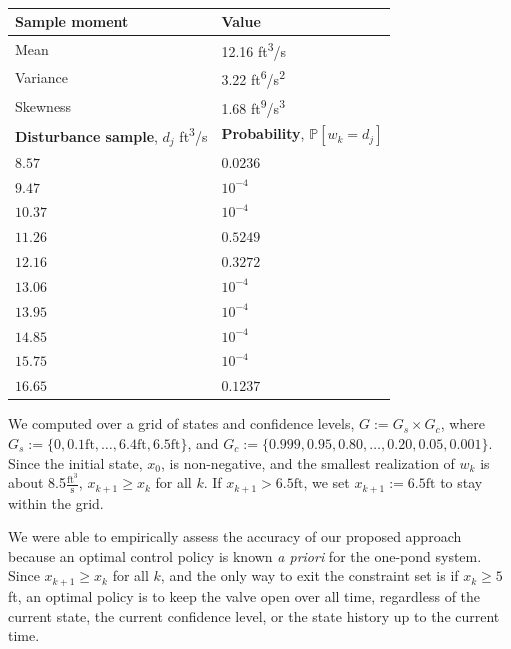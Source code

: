 \documentclass[letterpaper, 10 pt, conference]{ieeeconf}  %
\begin{document}
\begin{table}
\begin{center}
\caption{}
\begin{tabular}{| p{3.5cm} | p{3.5cm} |}
\hline
\bf{Sample moment} & \bf{Value}  \\ \hline
Mean & 12.16 ft\textsuperscript{3}/s \\ 
Variance & 3.22 ft\textsuperscript{6}/s\textsuperscript{2} \\ 
Skewness & 1.68 ft\textsuperscript{9}/s\textsuperscript{3} \\ 
\hline 
\textbf{Disturbance sample}, $d_j$ ft\textsuperscript{3}/s & \textbf{Probability}, $\mathbb{P}[w_k = d_j]$ \\ \hline
$8.57$ 		& $0.0236$ \\
$9.47$ 		& $10^{-4}$ \\
$10.37$ 		& $10^{-4}$ \\
$11.26$  & $0.5249$ \\ 
$12.16$ & $0.3272$ \\ 
$13.06$  & $10^{-4}$ \\ 
$13.95$  & $10^{-4}$ \\ 
$14.85$  & $10^{-4}$ \\ 
$15.75$  & $10^{-4}$ \\ 
$16.65$  & $0.1237$ \\ \hline
\end{tabular}
\begin{flushleft} \end{flushleft}
\label{dist}
\end{center}
\end{table}
%
We computed over a grid of states and confidence levels, $G := G_s \times G_c$, where  
$G_s := \{0, 0.1\text{ft}, \dots, 6.4\text{ft}, 6.5\text{ft}\}$,
and $G_c := \{0.999, 0.95, 0.80, \dots, 0.20, 0.05, 0.001\}$.
Since the initial state, $x_0$, is non-negative, and the smallest realization of $w_k$ is about 8.5$\frac{\text{ft}^3}{\text{s}}$, 
$x_{k+1}\geq x_k$ for all $k$. 
If $x_{k+1} > 6.5\text{ft}$, we set $x_{k+1} := 6.5\text{ft}$ to stay within the grid.

We were able to empirically assess the accuracy of our proposed approach because an optimal control policy is known \textit{a priori} for the one-pond system.
Since $x_{k+1}\geq x_k$ for all $k$, and the only way to exit the constraint set is if $x_k \geq 5$ft,
an optimal policy is to keep the valve open over all time, regardless of the current state, the current confidence level, or the state history up to the current time.
\end{document}
